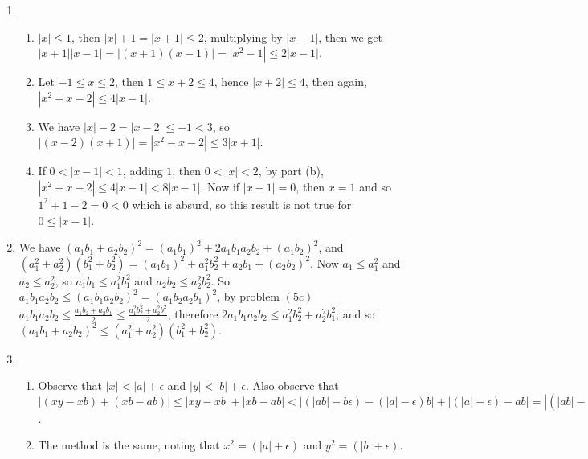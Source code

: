 \begin{enumerate}[label=(\arabic*)]
    \item [(7)]
        \begin{enumerate}
            \item $|x| \leq 1$, then  $|x|+1 =|x+1| \leq 2$, multiplying by  $|x-1|$, then we get  $|x+1||x-1|=|(x+1)(x-1)|=
                |x^2-1| \leq 2|x-1|$.

            \item Let  $-1 \leq x \leq 2$, then  $1 \leq x+2 \leq 4$, hence $|x+2| \leq 4$, then again, $|x^2+x-2| \leq 4|x-1|$.

            \item We have $|x|-2=|x-2| \leq -1 < 3$, so  $|(x-2)(x+1)|=|x^2-x-2| \leq 3|x+1|$.

            \item If  $0<|x-1|<1$, adding $1$, then  $0<|x|<2$, by part (b), $|x^2+x-2| \leq 4|x-1|<8|x-1|$. Now if $|x-1|=0$, 
                then $x=1$ and so  $1^2+1-2=0<0$ which is absurd, so this result is not true for  $0 \leq |x-1|$.
        \end{enumerate}

    \item [(9)] We have $(a_1b_1+a_2b_2)^2=(a_1b_1)^2+2a_1b_1a_2b_2+(a_1b_2)^2$, and $(a_1^2+a_2^2)(b_1^2+b_2^2)=(a_1b_1)^2
        +a_1^2b_2^2+a_2b_1+(a_2b_2)^2$. Now $a_1 \leq a_1^2$ and $a_2 \leq a_2^2$, so $a_1b_1 \leq a_1^2b_1^2$ and $a_2b_2 \leq a_2^2b_2^2$. 
        So $a_1b_1a_2b_2 \leq (a_1b_1a_2b_2)^2=(a_1b_2a_2b_1)^2$, by problem $(5c)$  $a_1b_1a_2b_2 \leq \frac{a_1b_2+a_2b_1}{2} \leq 
        \frac{a_1^2b_2^2+a_2^2b_1^2}{2}$, therefore $2a_1b_1a_2b_2 \leq a_1^2b_2^2+a_2^2b_1^2$; and so $(a_1b_1+a_2b_2)^2 
        \leq (a_1^2+a_2^2)(b_1^2+b_2^2)$.

    \item [(10)]
        \begin{enumerate}
            \item Observe that $|x|<|a|+\epsilon$ and  $|y|<|b|+\epsilon$. Also observe that $|(xy-xb)+(xb-ab)| \leq 
                |xy-xb|+|xb-ab|<|(|ab|-b\epsilon)-(|a|-\epsilon)b|+|(|a|-\epsilon)-ab| = |(|ab|-a\epsilon-b\epsilon+\epsilon^2)|+
                    ||ab|-b\epsilon-ab|=|-a\epsilon+\epsilon^2|+||ab|-b\epsilon-ab|=|-a\epsilon|+|-b\epsilon|=|-a\epsilon|
                    +|-b\epsilon|+\epsilon^2=(|a|+|b|)\epsilon+\epsilon^2$.

                \item The method is the same, noting that $x^2=(|a|+\epsilon)$ and  $y^2=(|b|+\epsilon)$.
        \end{enumerate}

\end{enumerate}
